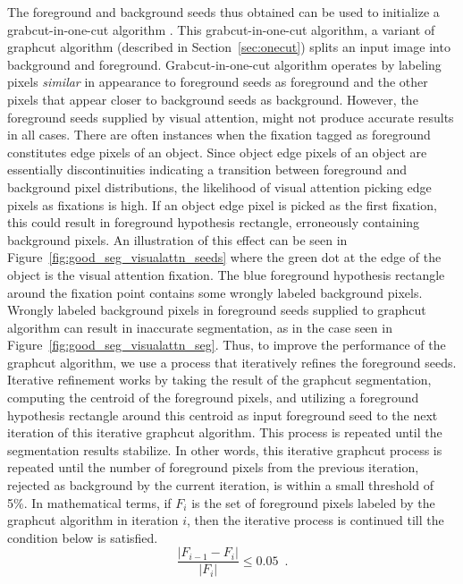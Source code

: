 \documentclass {udthesis}
\begin{document}
The foreground and background seeds thus obtained can be used to initialize a grabcut-in-one-cut algorithm \cite{onecut}. This grabcut-in-one-cut algorithm, a variant of graphcut algorithm (described in Section~\ref{sec:onecut}) splits an input image into background and foreground. Grabcut-in-one-cut algorithm operates by labeling pixels \textit{similar} in appearance to foreground seeds as foreground and the other pixels that appear closer to background seeds as background.
However, the foreground seeds supplied by visual attention, might not produce accurate results in all cases. There are often instances when the fixation tagged as foreground constitutes edge pixels of an object. Since object edge pixels of an object are essentially discontinuities indicating a transition between foreground and background pixel distributions, the likelihood of visual attention picking edge pixels as fixations is high. If an object edge pixel is picked as the first fixation, this could result in foreground hypothesis rectangle, erroneously containing background pixels. An illustration of this effect can be seen in Figure~\ref{fig:good_seg_visualattn_seeds} where the green dot at the edge of the object is the visual attention fixation. The blue foreground hypothesis rectangle around the fixation point contains some wrongly labeled background pixels. Wrongly labeled background pixels in foreground seeds supplied to graphcut algorithm can result in inaccurate segmentation, as in the case seen in Figure~\ref{fig:good_seg_visualattn_seg}. Thus, to improve the performance of the graphcut algorithm, we use a process that iteratively refines the foreground seeds. Iterative refinement works by taking the result of the graphcut segmentation, computing the centroid of the foreground pixels, and utilizing a foreground hypothesis rectangle around this centroid as input foreground seed to the next iteration of this iterative graphcut algorithm. This process is repeated until the segmentation results stabilize. In other words, this iterative graphcut process is repeated 
until the number of foreground pixels from the previous iteration, rejected as background by the current iteration, is within a small threshold of 5\%. In mathematical terms, if $F_i$ is the set of foreground pixels labeled by the graphcut algorithm in iteration $i$, then the iterative process is continued till the condition below is satisfied.
%
\begin{equation}
 \label{eqn:seg_threshold}
 \frac{|F_{i-1}-F_{i}|}{|F_i|} \leq 0.05\enspace .
\end{equation}
\end{document}
